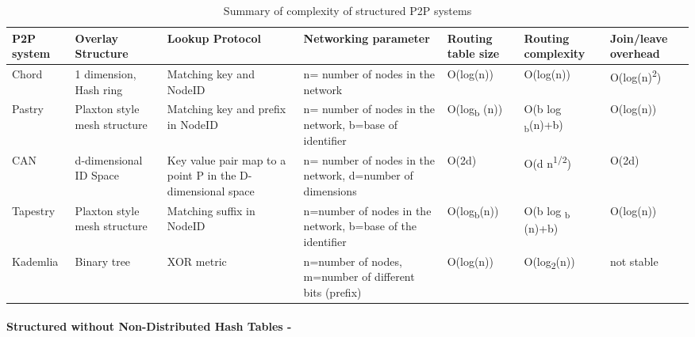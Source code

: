 \documentclass{./llncs2e/llncs}
\begin{document}
\begin{table}
  \begin{tabular}{| p{1.3cm} | p{1.6cm} | p{1.9cm} | p{1.8cm} | p{1.6cm} | p{1.8cm} | p{1.8cm} |}
    \hline                        
    \textbf{P2P system} & \textbf{Overlay Structure} & \textbf{Lookup Protocol} & \textbf{Networking parameter} & \textbf{Routing table size} & \textbf{Routing complexity} & \textbf{Join/leave overhead} \\
    
    \hline
    Chord & 1 dimension, Hash ring & Matching key and NodeID & n= number of nodes in the network & O(log(n)) & O(log(n)) & O(log(n)\textsuperscript{2}) \\
    
    \hline
    Pastry & Plaxton style mesh structure & Matching key and prefix in NodeID & n= number of nodes in the network, b=base of identifier & O(log\textsubscript{b} (n)) & O(b log \textsubscript{b}(n)+b) & O(log(n)) \\
    
    \hline
    CAN & d-dimensional ID Space & Key value pair map to a point P in the D-dimensional space & n= number of nodes in the network, d=number of dimensions & O(2d) & O(d n\textsuperscript{1/2}) & O(2d) \\
    
    \hline
    Tapestry & Plaxton style mesh structure & Matching suffix in NodeID & n=number of nodes in the network, b=base of the identifier & O(log\textsubscript{b}(n)) & O(b log \textsubscript{b} (n)+b) & O(log(n)) \\
    
    \hline  
    Kademlia & Binary tree & XOR metric & n=number of nodes, m=number of different bits (prefix) & O(log(n)) & O(log\textsubscript{2}(n)) & not stable \\
    \hline      
  \end{tabular}
  \caption{Summary of complexity of structured P2P systems}
  \label{table:Complexity of structured P2P systems using a DHT}
\end{table}


\paragraph{\textbf{Structured without Non-Distributed Hash Tables -}} %
\label{par:Structured without Non-Distributed Hash Tables}
\end{document}
